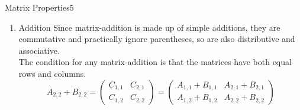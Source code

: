 \begin{questions}
\begin{question}{Matrix Properties}{5}
\begin{answer}
\begin{enumerate}
		
	$(A*B)*C = A*(B*C)$
	\begin{equation*} 
		(
		\begin{pmatrix} %
			0 & 1 \\	%
			0 & 0
		\end{pmatrix} 
		*
		\begin{pmatrix} %
			0 & 0 \\	%
			1 & 0
		\end{pmatrix}
		) *
		\begin{pmatrix} %
			1 & 1 \\	%
			1 & 1
		\end{pmatrix}
		=
		\begin{pmatrix} %
			1 & 1 \\	%
			0 & 0
		\end{pmatrix}	
	\end{equation*}
	\begin{equation*} 	
		\begin{pmatrix} %
			0 & 1 \\	%
			0 & 0
		\end{pmatrix} 
		* (
		\begin{pmatrix} %
			0 & 0 \\	%
			1 & 0
		\end{pmatrix}
		 *
		\begin{pmatrix} %
			1 & 1 \\	%
			1 & 1
		\end{pmatrix}
		) =
		\begin{pmatrix} %
			1 & 1 \\	%
			0 & 0
		\end{pmatrix}	
	\end{equation*}
	\item Addition
		Since matrix-addition is made up of simple additions, they are commutative and practically ignore parentheses, so are also distributive and associative.\\
	The condition for any matrix-addition is that the matrices have both equal rows and columns.\\
	\begin{equation*} 
		A_{2,2}+B_{2,2}=
		\begin{pmatrix}
			C_{1,1} & C_{2,1} \\
			C_{1,2} & C_{2,2}
		\end{pmatrix}
		=
	\begin{pmatrix}
		A_{1,1}+B_{1,1} & A_{2,1}+B_{2,1} \\
		A_{1,2}+B_{1,2} & A_{2,2}+B_{2,2}
	\end{pmatrix}
	\end{equation*}
	\end{enumerate}
		

\end{answer}
\end{question}
\end{questions}
